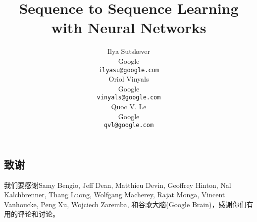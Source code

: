 \documentclass{article} %
\title{Sequence to Sequence Learning\\with Neural Networks}
\author{
Ilya Sutskever \\
Google\\
\texttt{ilyasu@google.com} \\
\And
Oriol Vinyals \\
Google\\
\texttt{vinyals@google.com} \\
\And
Quoc V. Le \\
Google\\
\texttt{qvl@google.com} \\
}
\begin{document}
\begin{CJK*}{UTF8}{gbsn}

\maketitle















\small
\section{致谢}

我们要感谢Samy Bengio, Jeff Dean, Matthieu Devin, Geoffrey Hinton, Nal Kalchbrenner, Thang Luong, Wolfgang Macherey, Rajat Monga, Vincent Vanhoucke, Peng Xu, Wojciech Zaremba,
和谷歌大脑(Google Brain)，感谢你们有用的评论和讨论。


 

\end{CJK*}
\end{document}
